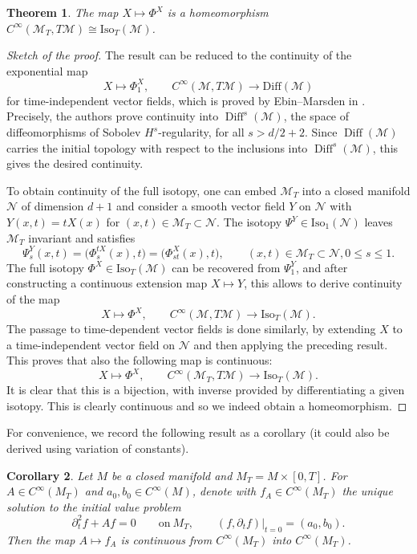 \documentclass[pdftex]{sigma}
\numberwithin{equation}{section}
\newtheorem{Theorem}{Theorem}[section]
\newtheorem{Corollary}[Theorem]{Corollary}
\theoremstyle{definition}
\newcommand{\1}{{\bf 1}}
\DeclareMathOperator{\Diff}{Diff}
\begin{document}
\begin{Theorem}\label{thm_isotopies} The map $X\mapsto \Phi^X$ is a homeomorphism $C^\infty(\mathcal M_T,T\mathcal M)\cong \mathrm{Iso}_T(\mathcal M)$.
\end{Theorem}

\begin{proof}[Sketch of the proof]
The result can be reduced to the continuity of the exponential map
\[
	X\mapsto \Phi^X_1,\qquad C^\infty(\mathcal M,T\mathcal M)\rightarrow \mathrm{Diff}(\mathcal M)
\]
for time-independent vector fields, which is proved by Ebin--Marsden in \cite[Theorem 3.1]{EbMa70}. Precisely, the authors prove continuity into $\Diff^s(\mathcal M)$, the space of diffeomorphisms of Sobolev $H^s$-regularity, for all $s>d/2+2$. Since $\Diff(\mathcal M)$ carries the initial topology with respect to the inclusions into $\Diff^s(\mathcal M)$, this gives the desired continuity.

To obtain continuity of the full isotopy, one can embed $\mathcal M_T$ into a closed manifold $\mathcal N$ of dimension $d+1$ and consider a smooth vector field $Y$ on $\mathcal N$ with $Y(x,t)=tX(x)$ for $(x,t)\in \mathcal M_T\subset \mathcal N$. The isotopy $\Psi^Y\in \mathrm{Iso}_1(\mathcal N)$ leaves $\mathcal M_T$ invariant and satisfies
\[\Psi_s^Y(x,t)=\bigl(\Phi_s^{tX}(x),t\bigr)=\bigl(\Phi^X_{st}(x),t\bigr),\qquad (x,t)\in \mathcal M_T\subset \mathcal N, 0\le s \le 1.\]
The full isotopy $\Phi^X\in \mathrm{Iso}_T(\mathcal M)$ can be recovered from $\Psi_1^Y$, and after constructing a continuous extension map $X\mapsto Y$, this allows to derive continuity of the map
\[
 X\mapsto \Phi^X,\qquad C^\infty(\mathcal M,T\mathcal M)\rightarrow \mathrm{Iso}_T(\mathcal M).
\]	
The passage to time-dependent vector fields is done similarly, by extending $X$ to a time-independent vector field on $\mathcal N$ and then applying the preceding result. This proves that also the following map is continuous:
\[
 X\mapsto \Phi^X,\qquad C^\infty(\mathcal M_T,T\mathcal M)\rightarrow \mathrm{Iso}_T(\mathcal M).	
\]
It is clear that this is a bijection, with inverse provided by differentiating a given isotopy. This is clearly continuous and so we indeed obtain a homeomorphism.
\end{proof}

For convenience, we record the following result as a corollary (it could also be derived using variation of constants).

\begin{Corollary}\label{cor_pardep}
Let $M$ be a closed manifold and $M_T=M\times[0,T]$. For $A\in C^\infty(M_T)$ and $a_0,b_0\in C^\infty(M)$, denote with $f_A\in C^\infty(M_T)$ the unique solution to the initial value problem
\[
	\partial_{t}^2f + Af = 0 \qquad\text{on}\  M_T,\qquad (f,\partial_tf)\vert_{t=0} = (a_0,b_0).
\]	
Then the map $A\mapsto f_A$ is continuous from $C^\infty(M_T)$ into $C^\infty(M_T)$.
\end{Corollary}
\end{document}
